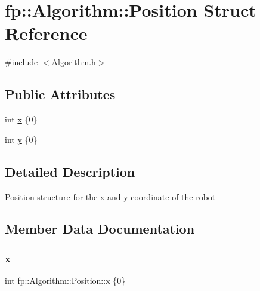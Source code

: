 \hypertarget{structfp_1_1_algorithm_1_1_position}{}\section{fp\+:\+:Algorithm\+:\+:Position Struct Reference}
\label{structfp_1_1_algorithm_1_1_position}


{\ttfamily \#include $<$Algorithm.\+h$>$}

\subsection*{Public Attributes}
\begin{DoxyCompactItemize}
\item 
int \hyperlink{structfp_1_1_algorithm_1_1_position_a3ff5edbcb349dc2f7fcc17b9b7d646f8}{x} \{0\}
\item 
int \hyperlink{structfp_1_1_algorithm_1_1_position_a78a81d6698d3fb3479a433d389fac322}{y} \{0\}
\end{DoxyCompactItemize}


\subsection{Detailed Description}
\hyperlink{structfp_1_1_algorithm_1_1_position}{Position} structure for the x and y coordinate of the robot 

\subsection{Member Data Documentation}
\mbox{\label{structfp_1_1_algorithm_1_1_position_a3ff5edbcb349dc2f7fcc17b9b7d646f8}} 
\subsubsection{\texorpdfstring{x}{x}}
{\footnotesize\ttfamily int fp\+::\+Algorithm\+::\+Position\+::x \{0\}}

\mbox{\label{structfp_1_1_algorithm_1_1_position_a78a81d6698d3fb3479a433d389fac322}} 
